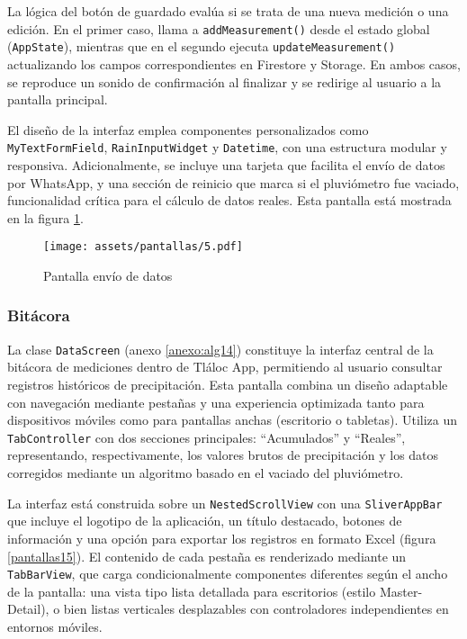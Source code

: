 La lógica del botón de guardado evalúa si se trata de una nueva medición o una edición. En el primer caso, llama a \texttt{addMeasurement()} desde el estado global (\texttt{AppState}), mientras que en el segundo ejecuta \texttt{updateMeasurement()} actualizando los campos correspondientes en Firestore y Storage. En ambos casos, se reproduce un sonido de confirmación al finalizar y se redirige al usuario a la pantalla principal.

El diseño de la interfaz emplea componentes personalizados como \texttt{MyTextFormField}, \texttt{RainInputWidget} y \texttt{Datetime}, con una estructura modular y responsiva. Adicionalmente, se incluye una tarjeta que facilita el envío de datos por WhatsApp, y una sección de reinicio que marca si el pluviómetro fue vaciado, funcionalidad crítica para el cálculo de datos reales. Esta pantalla está mostrada en la figura \ref{pantallas5}.

\begin{figure}[h!]
\centering
  \texttt{[image: assets/pantallas/5.pdf]}
  \caption{Pantalla envío de datos}
  \label{pantallas5}
\end{figure}



\newpage
\subsubsection*{Bitácora}

La clase \texttt{DataScreen}  (anexo \ref{anexo:alg14}) constituye la interfaz central de la bitácora de mediciones dentro de Tláloc App, permitiendo al usuario consultar registros históricos de precipitación. Esta pantalla combina un diseño adaptable con navegación mediante pestañas y una experiencia optimizada tanto para dispositivos móviles como para pantallas anchas (escritorio o tabletas). Utiliza un \texttt{TabController} con dos secciones principales: ``Acumulados'' y ``Reales'', representando, respectivamente, los valores brutos de precipitación y los datos corregidos mediante un algoritmo basado en el vaciado del pluviómetro.

La interfaz está construida sobre un \texttt{NestedScrollView} con una \texttt{SliverAppBar} que incluye el logotipo de la aplicación, un título destacado, botones de información y una opción para exportar los registros en formato Excel (figura \ref{pantallas15}). El contenido de cada pestaña es renderizado mediante un \texttt{TabBarView}, que carga condicionalmente componentes diferentes según el ancho de la pantalla: una vista tipo lista detallada para escritorios (estilo Master-Detail), o bien listas verticales desplazables con controladores independientes en entornos móviles.


